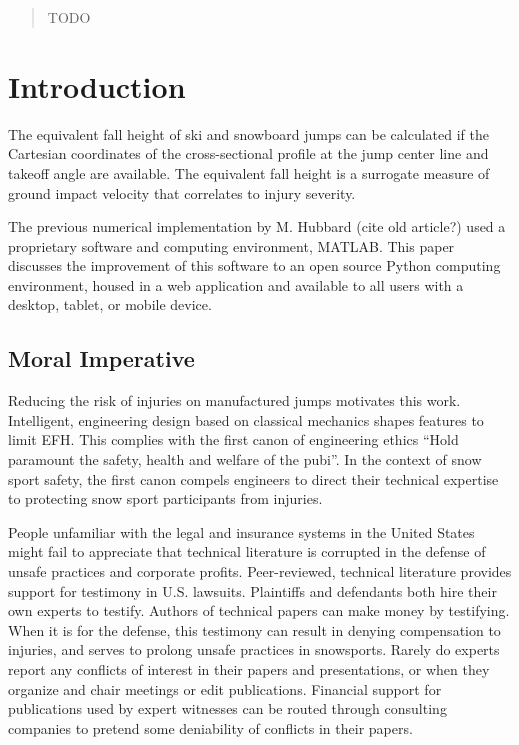 \documentclass{article}
\begin{document}
\begin{abstract}
    TODO
\end{abstract}

\section{Introduction}
%
The equivalent fall height of ski and snowboard jumps can be calculated if the
Cartesian coordinates of the cross-sectional profile at the jump center line
and takeoff angle are available. The equivalent fall height is a surrogate
measure of ground impact velocity that correlates to injury severity.

The previous numerical implementation by M. Hubbard (cite old article?) used a
proprietary software and computing environment, MATLAB. This paper discusses
the improvement of this software to an open source Python computing
environment, housed in a web application and available to all users with a
desktop, tablet, or mobile device.

\subsection{Moral Imperative}
%
Reducing the risk of injuries on manufactured jumps motivates this work.
Intelligent, engineering design based on classical mechanics shapes features to
limit EFH. This complies with the first canon of engineering ethics ``Hold
paramount the safety, health and welfare of the pubi''. In the context of snow
sport safety, the first canon compels engineers to direct their technical
expertise to protecting snow sport participants from injuries.

People unfamiliar with the legal and insurance systems in the United States
might fail to appreciate that technical literature is corrupted in the defense
of unsafe practices and corporate profits. Peer-reviewed, technical literature
provides support for testimony in U.S. lawsuits. Plaintiffs and defendants both
hire their own experts to testify. Authors of technical papers can make money
by testifying. When it is for the defense, this testimony can result in denying
compensation to injuries, and serves to prolong unsafe practices in snowsports.
Rarely do experts report any conflicts of interest in their papers and
presentations, or when they organize and chair meetings or edit publications.
Financial support for publications used by expert witnesses can be routed
through consulting companies to pretend some deniability of conflicts in their
papers.
\end{document}
